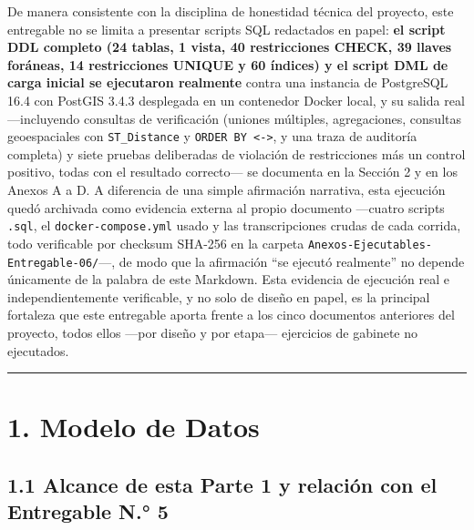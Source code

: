 \documentclass[11pt,a4paper]{article}
\begin{document}
De manera consistente con la disciplina de honestidad técnica del proyecto, este entregable no se limita a presentar scripts SQL redactados en papel: \textbf{el script DDL completo (24 tablas, 1 vista, 40 restricciones CHECK, 39 llaves foráneas, 14 restricciones UNIQUE y 60 índices) y el script DML de carga inicial se ejecutaron realmente} contra una instancia de PostgreSQL 16.4 con PostGIS 3.4.3 desplegada en un contenedor Docker local, y su salida real ---incluyendo consultas de verificación (uniones múltiples, agregaciones, consultas geoespaciales con \texttt{ST\_Distance} y \texttt{ORDER\ BY\ \textless{}-\textgreater{}}, y una traza de auditoría completa) y siete pruebas deliberadas de violación de restricciones más un control positivo, todas con el resultado correcto--- se documenta en la Sección 2 y en los Anexos A a D. A diferencia de una simple afirmación narrativa, esta ejecución quedó archivada como evidencia externa al propio documento ---cuatro scripts \texttt{.sql}, el \texttt{docker-compose.yml} usado y las transcripciones crudas de cada corrida, todo verificable por checksum SHA-256 en la carpeta \texttt{Anexos-Ejecutables-Entregable-06/}---, de modo que la afirmación ``se ejecutó realmente'' no depende únicamente de la palabra de este Markdown. Esta evidencia de ejecución real e independientemente verificable, y no solo de diseño en papel, es la principal fortaleza que este entregable aporta frente a los cinco documentos anteriores del proyecto, todos ellos ---por diseño y por etapa--- ejercicios de gabinete no ejecutados.

\begin{center}\rule{0.5\linewidth}{0.5pt}\end{center}

\section{1. Modelo de Datos}\label{modelo-de-datos}

\subsection{1.1 Alcance de esta Parte 1 y relación con el Entregable N.° 5}\label{alcance-de-esta-parte-1-y-relaciuxf3n-con-el-entregable-n.-5}
\end{document}
